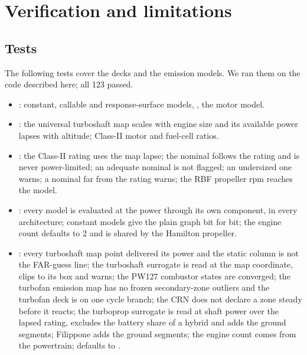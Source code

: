 \documentclass[a4paper,11pt]{article}
\begin{document}
\section{Verification and limitations}\label{sec:verification}

\subsection{Tests}
The following tests cover the decks and the emission models. We ran them on the code described
here; all 123 passed.
\begin{itemize}
\item {}: constant, callable and response-surface models,
  , the motor model.
\item {}: the universal turboshaft map scales
  with engine size and its available power lapses with altitude; Class-II motor and fuel-cell
  ratios.
\item {}: the Class-II rating uses the map lapse;
  the nominal follows the rating and is never power-limited; an adequate nominal is not flagged;
  an undersized one warns; a nominal far from the rating warns; the RBF propeller rpm reaches the
  model.
\item {}: every model is evaluated at
  the power through its own component, in every architecture; constant models give the plain
  graph bit for bit; the engine count defaults to 2 and is shared by the Hamilton propeller.
\item {}: every turboshaft map point
  delivered its power and the static column is not the FAR-guess line; the turboshaft surrogate
  is read at the map coordinate, clips to its box and warns; the PW127 combustor states are
  converged; the turbofan emission map has no frozen secondary-zone outliers and the turbofan
  deck is on one cycle branch; the CRN does not declare a zone steady before it reacts; the
  turboprop surrogate is read at shaft power over the lapsed rating, excludes the battery share
  of a hybrid and adds the ground segments; Filippone adds the ground segments; the engine count
  comes from the powertrain;  defaults to .

\end{itemize}
\end{document}
